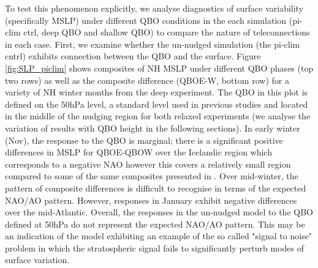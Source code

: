 To test this phenomenon explicitly, we analyse  diagnostics of surface variability (specifically MSLP) under different QBO conditions in the each simulation (pi-clim ctrl, deep QBO and shallow QBO) to compare the nature of teleconnections in each case. First, we examine whether the un-nudged simulation (the pi-clim cntrl) exhibits connection between the QBO and the surface. Figure \ref{fig:SLP_piclim} shows composites of NH MSLP under different QBO phases (top two rows) as well as the composite difference (QBOE-W, bottom row) for a variety of NH winter months from the deep experiment. The QBO in this plot is defined on the 50hPa level, a standard level used in previous studies \citep{ansteyHighlatitude2014b} and located in the middle of the nudging region for both relaxed experiments (we analyse the variation of results with QBO height in the following sections). In early winter (Nov), the response to the QBO is marginal; there is a significant positive differences in MSLP for QBOE-QBOW over the Icelandic region which corresponds to a negative NAO however this covers a relatively small region compared to some of the same composites presented in \cite{andrewsObserved2019d}. Over mid-winter, the pattern of composite differences is difficult to recognise in terms of the expected NAO/AO pattern. However, responses in January exhibit negative differences over the mid-Atlantic. Overall, the responses in the un-nudged model to the QBO defined at 50hPa do not represent the expected NAO/AO pattern. This may be an indication of the model exhibiting an example of the so called "signal to noise" problem \citep{scaifeSignaltonoise2018b} in which the stratospheric signal fails to significantly perturb modes of surface variation. 


